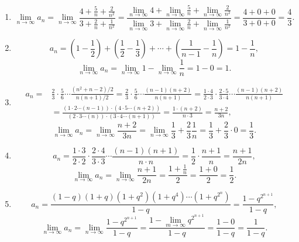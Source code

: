 \begin{solution}
    \begin{enumerate}[(1)]
        \item $$\lim_{n \to \infty} a_n = \lim_{n \to \infty} \frac{4 + \frac{5}{n} + \frac{2}{n^2}}{3 + \frac{2}{n} + \frac{1}{n^2}} = \frac{\displaystyle \lim_{n \to \infty} 4 + \lim_{n \to \infty} \frac{5}{n} + \lim_{n \to \infty} \frac{2}{n^2}}{\displaystyle \lim_{n \to \infty} 3 + \lim_{n \to \infty} \frac{2}{n} + \lim_{n \to \infty} \frac{1}{n^2}} = \frac{4 + 0 + 0}{3 + 0 + 0} = \frac{4}{3}.$$
        \item $$a_n = \left( 1 - \frac{1}{2} \right) + \left( \frac{1}{2} - \frac{1}{3} \right) + \cdots + \left( \frac{1}{n-1} - \frac{1}{n} \right) = 1 - \frac{1}{n},$$
              $$\lim_{n \to \infty} a_n = \lim_{n \to \infty} 1 - \lim_{n \to \infty} \frac{1}{n} = 1 - 0 = 1.$$
        \item \begin{align*}
                  a_n = & \frac{2}{3} \cdot \frac{5}{6} \cdots \frac{(n^2 + n - 2)/2}{n(n+1)/2} = \frac{2}{3} \cdot \frac{5}{6} \cdots \frac{(n-1)(n+2)}{n(n+1)} = \frac{1\cdot 4}{2\cdot 3} \cdot \frac{2\cdot 5}{3\cdot 4} \cdots \frac{(n-1)(n+2)}{n(n+1)}
                  \\&= \frac{\left(1\cdot 2   \cdots (n-1) \right)\cdot\left(4\cdot 5 \cdots (n+2 )\right)}{\left(2\cdot 3  \cdots  (n) \right)\cdot\left(3\cdot 4 \cdots (n+1 )\right)}= \frac{1\cdot(n+2)}{n\cdot3} = \frac{n+2}{3n}
              ,\end{align*}
              $$\lim_{n \to \infty} a_n = \lim_{n \to \infty} \frac{n+2}{3n}= \lim_{n \to \infty}\frac{1}{3}+\frac{2}{3}\frac{1}{n} = \frac{1}{3}+\frac{2}{3}\cdot 0 = \frac{1}{3}.$$
        \item $$a_n = \frac{1 \cdot 3}{2 \cdot 2} \cdot \frac{2 \cdot 4}{3 \cdot 3} \cdots \frac{(n-1)(n+1)}{n \cdot n} = \frac{1}{2} \cdot \frac{n+1}{n} = \frac{n+1}{2n},$$
              $$\lim_{n \to \infty} a_n = \lim_{n \to \infty} \frac{n+1}{2n} = \frac{1 + \frac{1}{n}}{2} = \frac{1 + 0}{2} = \frac{1}{2}.$$
        \item $$a_n = \frac{(1-q)(1+q)(1+q^2)(1+q^4) \cdots (1+q^{2^n})}{1-q} = \frac{1-q^{2^{n+1}}}{1-q},$$
              $$\lim_{n \to \infty} a_n = \lim_{n \to \infty} \frac{1-q^{2^{n+1}}}{1-q} = \frac{\displaystyle 1 - \lim_{m \to \infty} q^{2^{n+1}}}{1-q} = \frac{1 - 0}{1-q} = \frac{1}{1-q}.$$
    \end{enumerate}
\end{solution}

